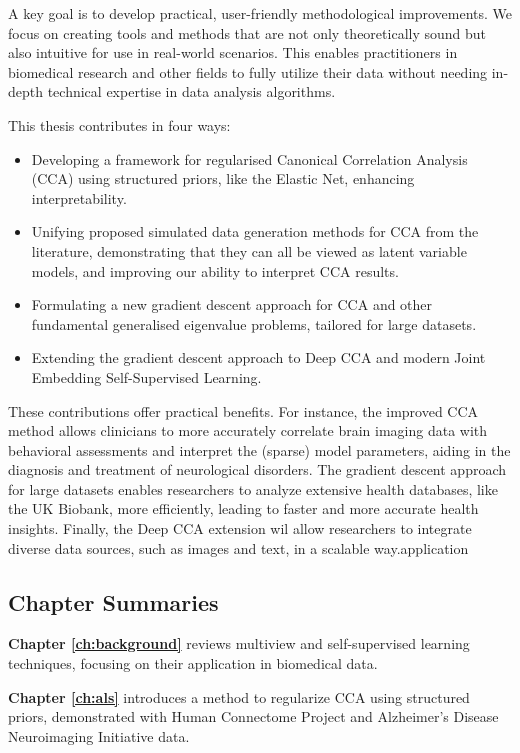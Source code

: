 A key goal is to develop practical, user-friendly methodological improvements. We focus on creating tools and methods that are not only theoretically sound but also intuitive for use in real-world scenarios. This enables practitioners in biomedical research and other fields to fully utilize their data without needing in-depth technical expertise in data analysis algorithms.

This thesis contributes in four ways:

\begin{itemize}
    \item Developing a framework for regularised Canonical Correlation Analysis (CCA) using structured priors, like the Elastic Net, enhancing interpretability.
    \item Unifying proposed simulated data generation methods for CCA from the literature, demonstrating that they can all be viewed as latent variable models, and improving our ability to interpret CCA results.
    \item Formulating a new gradient descent approach for CCA and other fundamental generalised eigenvalue problems, tailored for large datasets.
    \item Extending the gradient descent approach to Deep CCA and modern Joint Embedding Self-Supervised Learning.
\end{itemize}

These contributions offer practical benefits. For instance, the improved CCA method allows clinicians to more accurately correlate brain imaging data with behavioral assessments and interpret the (sparse) model parameters, aiding in the diagnosis and treatment of neurological disorders. The gradient descent approach for large datasets enables researchers to analyze extensive health databases, like the UK Biobank, more efficiently, leading to faster and more accurate health insights. Finally, the Deep CCA extension wil allow researchers to integrate diverse data sources, such as images and text, in a scalable way.application

\subsection{Chapter Summaries}

\textbf{Chapter \ref{ch:background}} reviews multiview and self-supervised learning techniques, focusing on their application in biomedical data.

\textbf{Chapter \ref{ch:als}} introduces a method to regularize CCA using structured priors, demonstrated with Human Connectome Project and Alzheimer's Disease Neuroimaging Initiative data.

